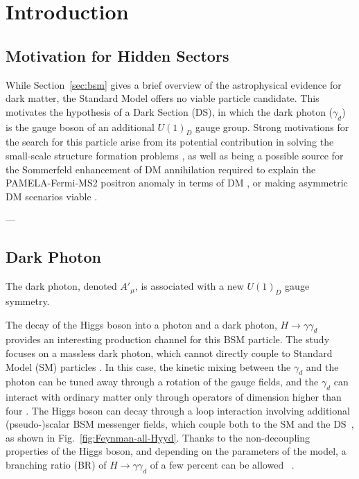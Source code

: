 \section{Introduction}

\subsection{Motivation for Hidden Sectors}

While Section~\ref{sec:bsm} gives a brief overview of the astrophysical evidence for dark matter, the Standard Model offers no viable particle candidate. This motivates the hypothesis of a Dark Section (DS), in which the dark photon ($\gamma_d$) is the gauge boson of an additional \( U(1)_D \) gauge group. Strong motivations for the search for this particle arise from its potential contribution in solving the small-scale structure formation problems \cite{Fan:2013tia} \cite{Heikinheimo:2015kra}, as well as being a possible source for the Sommerfeld enhancement of DM annihilation required to explain the PAMELA-Fermi-MS2 positron anomaly in terms of DM \cite{Arkani-Hamed:2008hhe}, or making asymmetric DM scenarios viable \cite{Zurek:2013wia}. 

---

\subsection{Dark Photon}

The dark photon, denoted $A'_\mu$, is associated with a new $U(1)_D$ gauge symmetry. 

The decay of the Higgs boson into a photon and a dark photon, $H\to\gamma\gamma_d$ provides an interesting production channel for this BSM particle. The study focuses on a massless dark photon, which cannot directly couple to Standard Model (SM) particles \cite{Fabbrichesi_2021}.
In this case, the kinetic mixing between the $\gamma_d$ and the photon can be tuned away through a rotation of the gauge fields, and the $\gamma_d$ can interact with ordinary matter only through operators of dimension higher
than four \cite{Fabbrichesi_2021}. The Higgs boson can decay through a loop interaction involving additional (pseudo-)scalar BSM messenger fields, which couple both to the SM and the DS~\cite{Gabrielli:2014oya, Biswas:2016jsh}, as shown in 
Fig.~\ref{fig:Feynman-all-Hyyd}. Thanks to the non-decoupling properties of the Higgs boson, and depending on the parameters of the model, a branching ratio (BR) of $H\to\gamma\gamma_d$ of a few percent can be allowed ~\cite{Beauchesne2023a, Beauchesne2023b}. 

